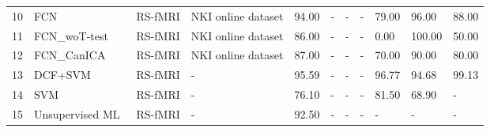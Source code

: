 \begin{table*}
\begin{tabular}{l|l|l|l|lllllll}
10                                       & FCN~\cite{mousavian2020depression}           & RS-fMRI                                            & NKI online dataset                           & 94.00                        & -                            & -                             & -                          & 79.00                           & 96.00                           & 88.00                   \\
11                                      & FCN\_woT-test~\cite{mousavian2020depression} & RS-fMRI                                            & NKI online dataset                           & 86.00                        & -                            & -                             & -                          & 0.00                            & 100.00                          & 50.00                   \\
12                                      & FCN\_CanICA~\cite{mousavian2020depression}   & RS-fMRI                                            & NKI online dataset                           & 87.00                        & -                            & -                             & -                          & 70.00                           & 90.00                           & 80.00                   \\
13                                      & DCF+SVM~\cite{2020Quantitative}            & RS-fMRI                                            & -                                            & 95.59                        & -                            & -                             & -                          & 96.77                           & 94.68                           & 99.13                   \\
14                                      & SVM~\cite{2016Multivariate}               & RS-fMRI                                            & -                                            & 76.10                        & -                            & -                             & -                          & 81.50                           & 68.90                           & -                       \\
15                                      & Unsupervised ML~\cite{2014Unsupervised}         & RS-fMRI                                            & -                                            & 92.50                        & -                            & -                             & -                          & -                               & -                               & -                       \\

\end{tabular}
\end{table*}
